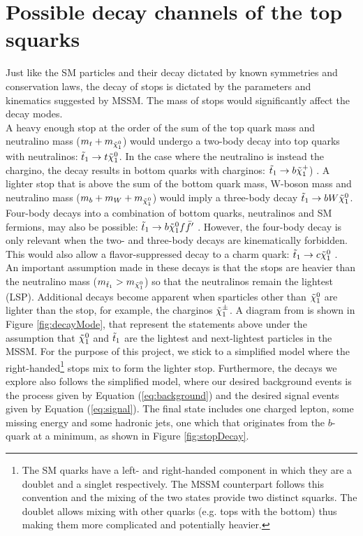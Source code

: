 \section{Possible decay channels of the top squarks} 
\label{sec:stopDecay}
Just like the SM particles and their decay dictated by known symmetries and conservation laws, the decay of stops is dictated by the parameters and kinematics suggested by MSSM. The mass of stops would significantly affect the decay modes. \\

A heavy enough stop at the order of the sum of the top quark mass and neutralino mass ($m_t+m_{\Tilde{\chi}_1^0}$) would undergo a two-body decay into top quarks with neutralinos: $\Tilde{t}_1\rightarrow t\Tilde{\chi}_1^0$. In the case where the neutralino is instead the chargino, the decay results in bottom quarks with charginos: $\Tilde{t}_1\rightarrow b\Tilde{\chi}_1^+$) \cite{boehm2000decays}. A lighter stop that is above the sum of the bottom quark mass, W-boson mass and neutralino mass ($m_b + m_W + m_{\Tilde{\chi}_1^0}$) would imply a three-body decay $\Tilde{t}_1\rightarrow b W \Tilde{\chi}_1^0$. Four-body decays into a combination of bottom quarks, neutralinos and SM fermions, may also be possible: $\Tilde{t}_1\rightarrow b\Tilde{\chi}_1^0 f \Bar{f}'$ \cite{boehm2000decays}. However, the four-body decay is only relevant when the two- and three-body decays are kinematically forbidden. This would also allow a flavor-suppressed decay to a charm quark: $\Tilde{t}_1\rightarrow c\Tilde{\chi}_1^0$ \cite{aad2014search}. \\

An important assumption made in these decays is that the stops are heavier than the neutralino mass ($m_{\Tilde{t}_1} > m_{\Tilde{\chi}_1^0} $) so that the neutralinos remain the lightest (LSP). Additional decays become apparent when sparticles other than $\Tilde{\chi}_1^0 $ are lighter than the stop, for example, the charginos $\Tilde{\chi}_1^{\pm}$. A diagram from \cite{aad2014search} is shown in Figure \ref{fig:decayMode}, that represent the statements above under the assumption that $ \Tilde{\chi}_1^0 $ and $\Tilde{t}_1 $ are the lightest and next-lightest particles in the MSSM. For the purpose of this project, we stick to a simplified model where the right-handed\footnote{The SM quarks have a left- and right-handed component in which they are a doublet and a singlet respectively. The MSSM counterpart follows this convention and the mixing of the two states provide two distinct squarks. The doublet allows mixing with other quarks (e.g. tops with the bottom) thus making them more complicated and potentially heavier.} stops mix to form the lighter stop. Furthermore, the decays we explore also follows the simplified model, where our desired background events is the process given by Equation (\ref{eq:background}) and the desired signal events given by Equation (\ref{eq:signal}). The final state includes one charged lepton, some missing energy and some hadronic jets, one which that originates from the $b$-quark at a minimum, as shown in Figure \ref{fig:stopDecay}.\\


